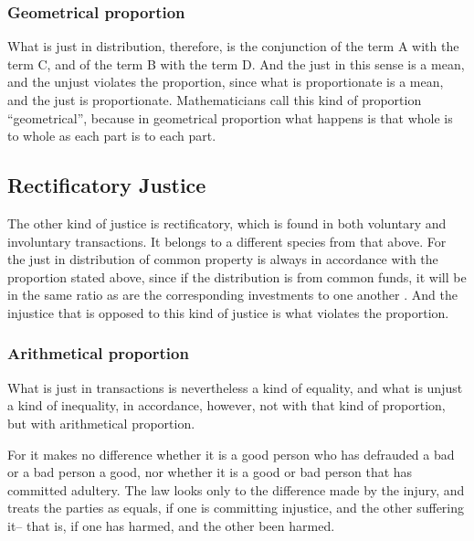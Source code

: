                     \subsubsection{Geometrical proportion}

                        What is just in distribution, therefore, is the conjunction of the term A with the term C, and of the term B with the term D. And the just in this sense is a mean, and the unjust violates the proportion, since what is proportionate is a mean, and the just is proportionate. Mathematicians call this kind of proportion “geometrical”, because in geometrical proportion what happens is that whole is to whole as each part is to each part.

                \subsection{Rectificatory Justice}

                    The other kind of justice is rectificatory, which is found in both voluntary and involuntary transactions. It belongs to a different species from that above. For the just in distribution of common property is always in accordance with the proportion stated above, since if the distribution is from common funds, it will be in the same ratio as are the corresponding investments to one another . And the injustice that is opposed to this kind of justice is what violates the proportion.

                    \subsubsection{Arithmetical proportion}

                        What is just in transactions is nevertheless a kind of equality, and what is unjust a kind of inequality, in accordance, however, not with that kind of proportion, but with arithmetical proportion.

                        \begin{remark}
                            For it makes no difference whether it is a good person who has defrauded a bad or a bad person a good, nor whether it is a good or bad person that has committed adultery. The law looks only to the difference made by the injury, and treats the parties as equals, if one is committing injustice, and the other suffering it– that is, if one has harmed, and the other been harmed.
                        \end{remark}

